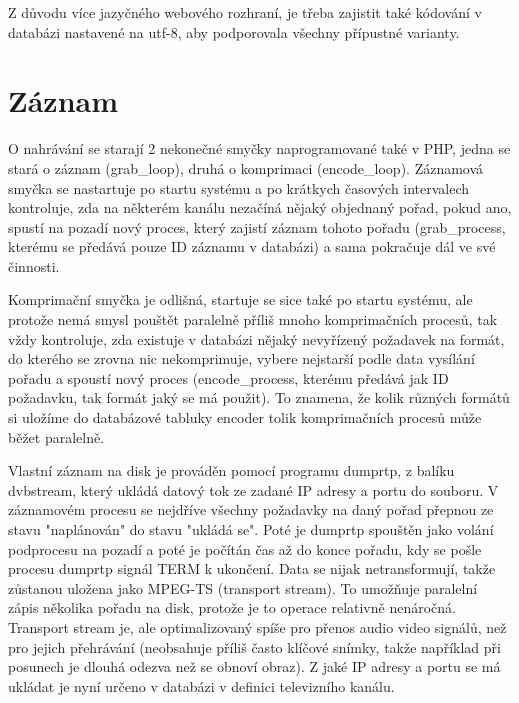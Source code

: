 \vspace{10pt}

Z důvodu více jazyčného webového rozhraní, je třeba zajistit také kódování v databázi nastavené na utf-8, aby podporovala všechny přípustné varianty.

\vspace{10pt}

\section{Záznam}

\vspace{10pt}

O nahrávání se starají 2 nekonečné smyčky naprogramované také v PHP, jedna se stará o záznam (grab\_loop), druhá o komprimaci (encode\_loop). Záznamová smyčka se nastartuje po startu systému a po krátkych časových intervalech kontroluje, zda na některém kanálu nezačíná nějaký objednaný pořad, pokud ano, spustí na pozadí nový proces, který zajistí záznam tohoto pořadu (grab\_process, kterému se předává pouze ID záznamu v databázi) a sama pokračuje dál ve své činnosti.

Komprimační smyčka je odlišná, startuje se sice také po startu systému, ale protože nemá smysl pouštět paralelně příliš mnoho komprimačních procesů, tak vždy kontroluje, zda existuje v databázi nějaký nevyřízený požadavek na formát, do kterého se zrovna nic nekomprimuje, vybere nejstarší podle data vysílání pořadu a spoustí nový proces (encode\_process, kterému předává jak ID požadavku, tak formát jaký se má použit). To znamena, že kolik různých formátů si uložíme do databázové tabluky encoder tolik komprimačních procesů může běžet paralelně.

\vspace{10pt}

Vlastní záznam na disk je prováděn pomocí programu dumprtp, z balíku dvbstream, který ukládá datový tok ze zadané IP adresy a portu do souboru. V záznamovém procesu se nejdříve všechny požadavky na daný pořad přepnou ze stavu "naplánován" do stavu "ukládá se". Poté je dumprtp spouštěn jako volání podprocesu na pozadí a poté je počítán čas až do konce pořadu, kdy se pošle procesu dumprtp signál TERM k ukončení. Data se nijak netransformují, takže zůstanou uložena jako MPEG-TS (transport stream). To umožňuje paralelní zápis několika pořadu na disk, protože je to operace relativně nenáročná. Transport stream je, ale optimalizovaný spíše pro přenos audio video signálů, než pro jejich přehrávání (neobsahuje příliš často klíčové snímky, takže například při posunech je dlouhá odezva než se obnoví obraz). Z jaké IP adresy a portu se má ukládat je nyní určeno v databázi v definici televizního kanálu.

